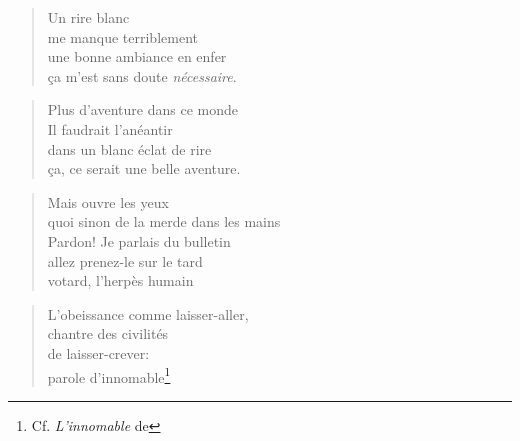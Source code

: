   \begin{verse}
    Un rire blanc\\
    me manque terriblement\\
    une bonne ambiance en enfer\\
    ça m’est sans doute \emph{nécessaire}.
  \end{verse}
  \begin{verse}
    Plus d’aventure dans ce monde\\
    Il faudrait l’anéantir\\
    dans un blanc éclat de rire\\
    ça, ce serait une belle aventure.
  \end{verse}
  \begin{verse}
    Mais ouvre les yeux\\
    quoi sinon de la merde dans les mains\\
    Pardon! Je parlais du bulletin\\
    allez prenez-le sur le tard\\
    votard, l’herpès humain
  \end{verse}
  \begin{verse}
    L’obeissance comme laisser-aller,\\
    chantre des civilités\\
    de laisser-crever:\\
    parole d’innomable\footnote{Cf. \emph{L’innomable} de }
  \end{verse}

